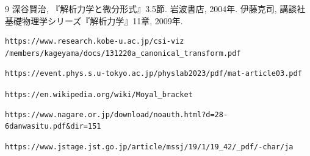 \documentclass{ltjsarticle}
\theoremstyle{definition}
\begin{document}
\begin{thebibliography}{9}
\bibitem{} 深谷賢治, 『解析力学と微分形式』3.5節. 岩波書店, 2004年.
\bibitem{} 伊藤克司, 講談社基礎物理学シリーズ『解析力学』11章, 2009年. 
\begin{verbatim}
https://www.research.kobe-u.ac.jp/csi-viz
/members/kageyama/docs/131220a_canonical_transform.pdf
\end{verbatim}
\begin{verbatim}
https://event.phys.s.u-tokyo.ac.jp/physlab2023/pdf/mat-article03.pdf
\end{verbatim}
 \verb|https://en.wikipedia.org/wiki/Moyal_bracket|
\begin{verbatim}
https://www.nagare.or.jp/download/noauth.html?d=28-6danwasitu.pdf&dir=151
\end{verbatim}
\begin{verbatim}
https://www.jstage.jst.go.jp/article/mssj/19/1/19_42/_pdf/-char/ja
\end{verbatim}
\end{thebibliography}
\end{document}
